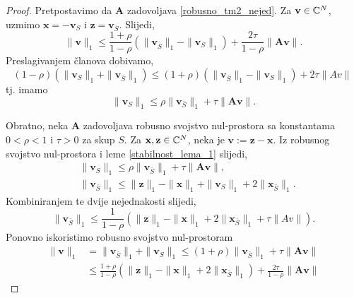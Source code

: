 \documentclass[a4paper,twoside,12pt]{memoir} %
\newcommand{\vect}[1]{\mathbf{#1}}
\renewcommand{\vec}{\vect}
\newcommand{\norm}[1]{\|{#1}\|}
\begin{document}
\begin{proof}
    Pretpostavimo da $\vec A$ zadovoljava \eqref{robusno_tm2_nejed}. Za $\vec v \in \C^N$, uzmimo $\vec x = - \vec v_S$ i $\vec z = \vec v_{\bar S}$. Slijedi,
    \begin{equation*}
        \norm{\vec v}_1 \leq \frac{1+\rho}{1- \rho}(\norm{\vec v_{\bar S}}_1 - \norm{\vec v_S}_1) + \frac{2 \tau}{1 - \rho} \norm{\vec{Av}}.
    \end{equation*}
    Preslagivanjem \v{c}lanova dobivamo,
    \begin{equation*}
        (1-\rho)(\norm{\vec v_S}_1 + \norm{\vec v_{\bar S}}_1) \leq (1 + \rho)(\norm{\vec v_{\bar S}}_1 - \norm{\vec v_S}_1) + 2 \tau \norm{Av}\
    \end{equation*}
    tj. imamo
    \begin{equation*}
        \norm{\vec v_S}_1 \leq \rho \norm{\vec v_{\bar S}}_1 + \tau \norm{\vec{Av}}.
    \end{equation*} 

    \indent Obratno, neka $\vec A$ zadovoljava robusno svojstvo nul-prostora sa konstantama $0<\rho<1$ i $\tau > 0$ za skup $S$. Za $\vec x, \vec z \in \C^N$, neka je $\vec v := \vec z - \vec x$. Iz robusnog svojstvo nul-prostora i leme \ref{stabilnost_lema_1} slijedi,
   \begin{align*}
       &\norm{\vec v_S}_1 \leq \rho \norm{\vec v_{\bar S}}_1 + \tau \norm{\vec{Av}},\\
       &\norm{\vec v_{\bar S}}_1 \leq \norm{\vec z}_1 - \norm{\vec x}_1 + \norm{\vec v_S}_1 + 2 \norm{\vec x_{\bar S}}_1.
   \end{align*} 
   Kombiniranjem te dvije nejednakosti slijedi,
   \begin{equation*}
       \norm{\vec v_{\bar S}}_1 \leq \frac{1}{1-\rho}(\norm{\vec z}_1 - \norm{\vec x}_1 + 2 \norm{\vec x_{\bar S}}_1 + \tau \norm{Av}). 
   \end{equation*}
   Ponovno iskoristimo robusno svojstvo nul-prostoram
   \begin{align*}
       \norm{\vec v}_1 &= \norm{\vec v_{\bar S}}_1 + \norm{\vec v_S}_1 \leq (1 + \rho)\norm{\vec v_{\bar S}}_1 + \tau \norm{\vec{Av}}\\
       & \leq \frac{1+\rho}{1-\rho}(\norm{\vec z}_1 - \norm{\vec x}_1 + 2 \norm{\vec x_{\bar S}}_1) + \frac{2 \tau}{1-\rho}  \norm{\vec{Av}}
   \end{align*}
\end{proof}
\end{document}
